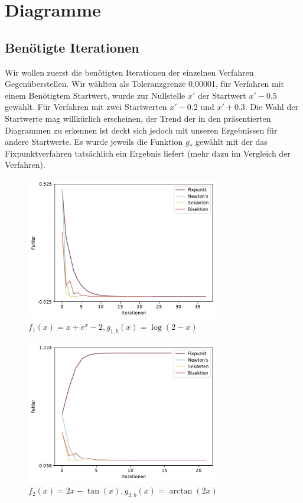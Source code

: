 \documentclass[a4paper,12pt]{article}
\newcommand{\1}{1\hspace{-0,9ex}1}
\begin{document}
\newpage
\section*{Diagramme}
\subsection*{Benötigte Iterationen}
Wir wollen zuerst die benötigten Iterationen der einzelnen Verfahren Gegenüberstellen. Wir wählten als Toleranzgrenze 0.00001, für Verfahren mit einem Benötigtem Startwert, wurde zur Nullstelle $x'$ der Startwert $x'-0.5$ gewählt. Für Verfahren mit zwei Startwerten $x'-0.2$ und $x'+0.3$. Die Wahl der Startwerte mag willkürlich erscheinen, der Trend der in den präsentierten Diagrammen zu erkennen ist deckt sich jedoch mit unseren Ergebnissen für andere Startwerte. Es wurde jeweils die Funktion $g_*$ gewählt mit der das Fixpunktverfahren tatsächlich ein Ergebnis liefert (mehr dazu im Vergleich der Verfahren).

\begin{figure}[H]
	\centering
	\includegraphics[width=0.75\textwidth]{plots/error_series_plot.pdf}
	\caption{$f_1(x) = x + e^x-2, g_{1,b}(x)=\log(2-x)$}
\end{figure}

\begin{figure}[H]
	\centering
	\includegraphics[width=0.75\textwidth]{plots/error_series_plot(1).pdf}
	\caption{$f_2(x) = 2x - \tan(x), g_{2,b}(x)=\arctan(2x)$}
\end{figure}
\end{document}
